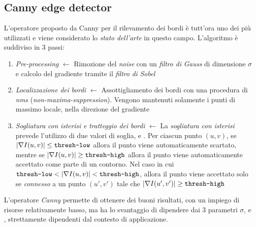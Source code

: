 \subsection{Canny edge detector}
L'operatore proposto da Canny \cite{bib:canny} per il rilevamento dei bordi \`e tutt'ora uno dei pi\`u utilizzati e viene considerato lo \textit{stato dell'arte} in questo campo. L'algoritmo \`e suddiviso in 3 passi:
\begin{enumerate}
	\item \textit{Pre-processing} $\gets$ Rimozione del \textit{noise} con un \textit{filtro di Gauss} di dimensione $\sigma$ e calcolo del gradiente tramite il \textit{filtro di Sobel}
	\item \textit{Localizzazione dei bordi} $\gets$ Assottigliamento dei bordi con una procedura di \textit{nms} (\textit{non-maxima-suppression}). Vengono mantenuti solamente i punti di massimo locale, nella direzione del gradiente
	\item \textit{Sogliatura con isterisi e tratteggio dei bordi} $\gets$ La \textit{sogliatura con isterisi} prevede l'utilizzo di due valori di soglia,  e . Per ciascun punto $(u, v)$, se $|\nabla I(u, v)| \leq \texttt{thresh-low}$ allora il punto viene automaticamente scartato, mentre se $|\nabla I(u, v)| \geq \texttt{thresh-high}$ allora il punto viene automaticamente accettato come parte di un contorno. Nel caso in cui $\texttt{thresh-low} < |\nabla I(u, v)| < \texttt{thresh-high}$, allora il punto viene accettato solo se \textit{connesso} a un punto $(u', v')$ tale che $|\nabla I(u', v')| \geq \texttt{thresh-high}$
\end{enumerate}\par
L'operatore \textit{Canny} permette di ottenere dei buoni risultati, con un impiego di risorse relativamente basso, ma ha lo svantaggio di dipendere dai 3 parametri $\sigma$,  e , strettamente dipendenti dal contesto di applicazione.
